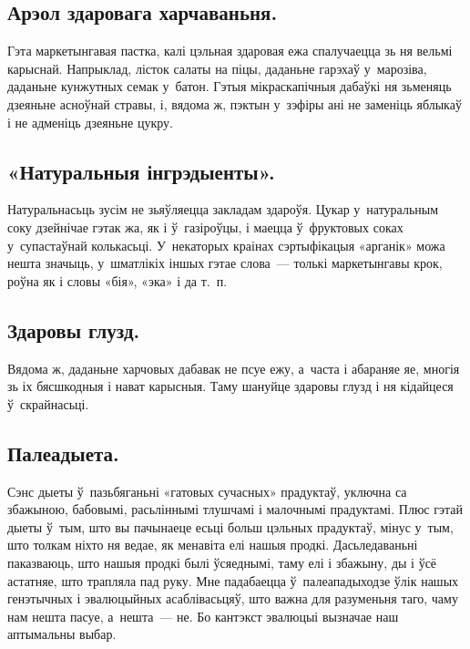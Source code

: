 \subsection{Арэол здаровага харчаваньня.}
Гэта маркетынгавая пастка, калі цэльная здаровая ежа спалучаецца зь ня вельмі карыснай. Напрыклад, лісток салаты на піцы, даданьне гарэхаў у~марозіва, даданьне кунжутных семак у~батон. Гэтыя мікраскапічныя дабаўкі ня зьменяць дзеяньне асноўнай стравы, і, вядома ж, пэктын у~зэфіры ані не заменіць яблыкаў і не адменіць дзеяньне цукру.

\subsection{«Натуральныя інгрэдыенты».}
Натуральнасьць зусім не зьяўляецца закладам здароўя. Цукар у~натуральным соку дзейнічае гэтак жа, як і ў~газіроўцы, і маецца ў~фруктовых соках у~супастаўнай колькасьці. У~некаторых краінах сэртыфікацыя «арганік» можа нешта значыць, у~шматлікіх іншых гэтае слова~--- толькі маркетынгавы крок, роўна як і словы «бія», «эка» і да т.~п.


\subsection{Здаровы глузд.}
Вядома ж, даданьне харчовых дабавак не псуе ежу, а~часта і абараняе яе, многія зь іх бясшкодныя і нават карысныя. Таму шануйце здаровы глузд і ня кідайцеся ў~скрайнасьці.

\subsection{Палеадыета.}
Сэнс дыеты ў~пазьбяганьні «гатовых сучасных» прадуктаў, уключна са збажыною, бабовымі, расьліннымі тлушчамі і малочнымі прадуктамі. Плюс гэтай дыеты ў~тым, што вы пачынаеце есьці больш цэльных прадуктаў, мінус у~тым, што толкам ніхто ня ведае, як менавіта елі нашыя продкі. Дасьледаваньні паказваюць, што нашыя продкі былі ўсяеднымі, таму елі і збажыну, ды і ўсё астатняе, што трапляла пад руку. Мне падабаецца ў~палеападыходзе ўлік нашых генэтычных і эвалюцыйных асаблівасьцяў, што важна для разуменьня таго, чаму нам нешта пасуе, а~нешта~--- не. Бо кантэкст эвалюцыі вызначае наш аптымальны выбар.

